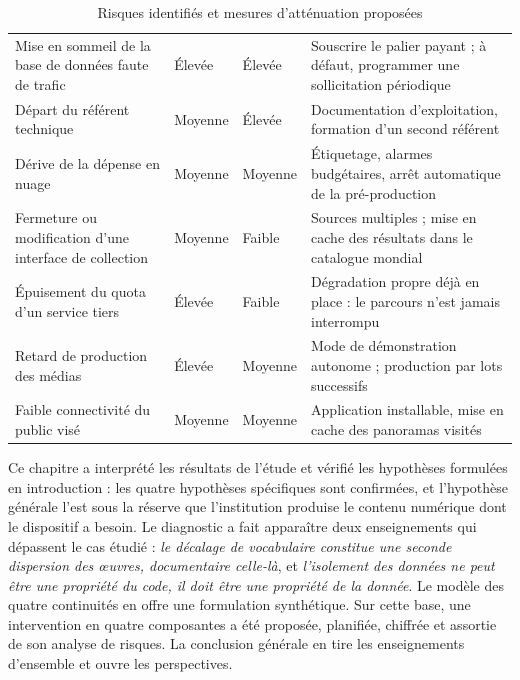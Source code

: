 \begin{table}[!ht]
\centering
\caption{Risques identifiés et mesures d'atténuation proposées}
\label{tab:risques}
\small
\begin{tabularx}{\textwidth}{|L{3.7cm}|C{2.1cm}|C{1.7cm}|X|}
\hline
{}
 &  &  &  \\ \hline
Mise en sommeil de la base de données faute de trafic & Élevée & Élevée & Souscrire le palier payant ; à défaut, programmer une sollicitation périodique \\ \hline
Départ du référent technique & Moyenne & Élevée & Documentation d'exploitation, formation d'un second référent \\ \hline
Dérive de la dépense en nuage & Moyenne & Moyenne & Étiquetage, alarmes budgétaires, arrêt automatique de la pré-production \\ \hline
Fermeture ou modification d'une interface de collection & Moyenne & Faible & Sources multiples ; mise en cache des résultats dans le catalogue mondial \\ \hline
Épuisement du quota d'un service tiers & Élevée & Faible & Dégradation propre déjà en place : le parcours n'est jamais interrompu \\ \hline
Retard de production des médias & Élevée & Moyenne & Mode de démonstration autonome ; production par lots successifs \\ \hline
Faible connectivité du public visé & Moyenne & Moyenne & Application installable, mise en cache des panoramas visités \\ \hline
\end{tabularx}
\end{table}

\conclchap

Ce chapitre a interprété les résultats de l'étude et vérifié les hypothèses
formulées en introduction : les quatre hypothèses spécifiques sont confirmées,
et l'hypothèse générale l'est sous la réserve que l'institution produise le
contenu numérique dont le dispositif a besoin. Le diagnostic a fait apparaître
deux enseignements qui dépassent le cas étudié : \emph{le décalage de
vocabulaire constitue une seconde dispersion des œuvres, documentaire celle-là},
et \emph{l'isolement des données ne peut être une propriété du code, il doit
être une propriété de la donnée}. Le modèle des quatre continuités en offre une
formulation synthétique. Sur cette base, une intervention en quatre composantes a
été proposée, planifiée, chiffrée et assortie de son analyse de risques. La
conclusion générale en tire les enseignements d'ensemble et ouvre les
perspectives.

